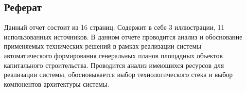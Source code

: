\subsection*{\Large{Реферат}}
Данный отчет состоит из 16 страниц.
Содержит в себе 3 иллюстрации, 11 использованных источников.
В данном отчете проводится анализ и обоснование применяемых технических решений в рамках реализации системы
автоматического формирования генеральных планов площадных объектов капитального строительства.
Проводится анализ имеющихся ресурсов для реализации системы, обосновывается выбор технологического стека и
выбор компонентов архитектуры системы.